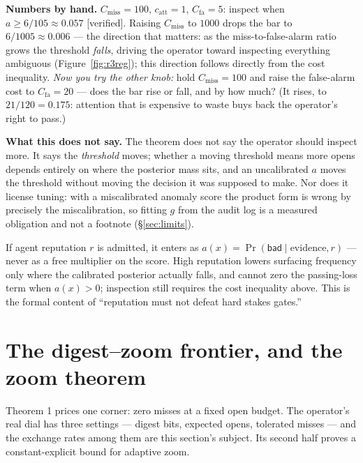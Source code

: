 \documentclass[11pt,a4paper]{article}
\begin{document}
\textbf{Numbers by hand.} $C_{\mathrm{miss}}{=}100$, $c_{\mathrm{att}}{=}1$, $C_{\mathrm{fa}}{=}5$: inspect when $a\ge 6/105\approx 0.057$ [verified]. Raising $C_{\mathrm{miss}}$ to $1000$ drops the bar to $6/1005\approx 0.006$ --- the direction that matters: as the miss-to-false-alarm ratio grows the threshold \emph{falls}, driving the operator toward inspecting everything ambiguous (Figure~\ref{fig:r3reg}); this direction follows directly from the cost inequality. \emph{Now you try the other knob:} hold $C_{\mathrm{miss}}{=}100$ and raise the false-alarm cost to $C_{\mathrm{fa}}{=}20$ --- does the bar rise or fall, and by how much? (It rises, to $21/120=0.175$: attention that is expensive to waste buys back the operator's right to pass.)

\textbf{What this does not say.} The theorem does not say the operator should inspect more. It says the \emph{threshold} moves; whether a moving threshold means more opens depends entirely on where the posterior mass sits, and an uncalibrated $a$ moves the threshold without moving the decision it was supposed to make. Nor does it license tuning: with a miscalibrated anomaly score the product form is wrong by precisely the miscalibration, so fitting $g$ from the audit log is a measured obligation and not a footnote (\S\ref{sec:limits}).

\begin{claim}
If agent reputation $r$ is admitted, it enters as $a(x)=\Pr(\mathsf{bad}\mid\text{evidence},r)$ --- never as a free multiplier on the score. High reputation lowers surfacing frequency only where the calibrated posterior actually falls, and cannot zero the passing-loss term when $a(x)>0$; inspection still requires the cost inequality above. This is the formal content of ``reputation must not defeat hard stakes gates.''
\end{claim}



\section{The digest--zoom frontier, and the zoom theorem}\label{sec:frontier}
Theorem 1 prices one corner: zero misses at a fixed open budget. The operator's real dial has three settings --- digest bits, expected opens, tolerated misses --- and the exchange rates among them are this section's subject. Its second half proves a constant-explicit bound for adaptive zoom.
\end{document}
